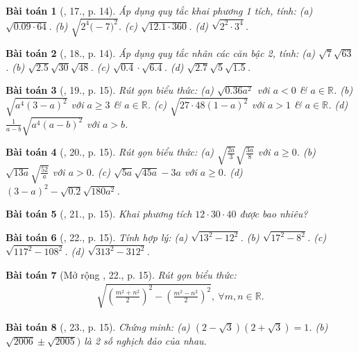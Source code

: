 \documentclass{article}
\newtheorem{baitoan}{Bài toán}
\begin{document}
\begin{baitoan}[\cite{SGK_Toan_9_tap_1}, 17., p. 14]
	Áp dụng quy tắc khai phương 1 tích, tính: (a) $\sqrt{0.09\cdot64}$. (b) $\sqrt{2^4\dot(-7)^2}$. (c) $\sqrt{12.1\cdot360}$. (d) $\sqrt{2^2\cdot3^4}$.
\end{baitoan}

\begin{baitoan}[\cite{SGK_Toan_9_tap_1}, 18., p. 14]
	Áp dụng quy tắc nhân các căn bậc 2, tính: (a) $\sqrt{7}\sqrt{63}$. (b) $\sqrt{2.5}\sqrt{30}\sqrt{48}$. (c) $\sqrt{0.4}\cdot\sqrt{6.4}$. (d) $\sqrt{2.7}\sqrt{5}\sqrt{1.5}$.
\end{baitoan}

\begin{baitoan}[\cite{SGK_Toan_9_tap_1}, 19., p. 15]
	Rút gọn biểu thức: (a) $\sqrt{0.36a^2}$ với $a < 0$ \& $a\in\mathbb{R}$. (b) $\sqrt{a^4(3 - a)^2}$ với $a\ge3$ \& $a\in\mathbb{R}$. (c) $\sqrt{27\cdot48(1 - a)^2}$ với $a > 1$ \& $a\in\mathbb{R}$. (d) $\frac{1}{a - b}\sqrt{a^4(a - b)^2}$ với $a > b$.
\end{baitoan}

\begin{baitoan}[\cite{SGK_Toan_9_tap_1}, 20., p. 15]
	Rút gọn biểu thức: (a) $\sqrt{\frac{2a}{3}}\sqrt{\frac{3a}{8}}$ với $a\ge0$. (b) $\sqrt{13a}\sqrt{\frac{52}{a}}$ với $a > 0$. (c) $\sqrt{5a}\sqrt{45a} - 3a$ với $a\ge0$. (d) $(3 - a)^2 - \sqrt{0.2}\sqrt{180a^2}$.
\end{baitoan}

\begin{baitoan}[\cite{SGK_Toan_9_tap_1}, 21., p. 15]
	Khai phương tích $12\cdot30\cdot40$ được bao nhiêu?
\end{baitoan}

\begin{baitoan}[\cite{SGK_Toan_9_tap_1}, 22., p. 15]
	Tính hợp lý: (a) $\sqrt{13^2 - 12^2}$. (b) $\sqrt{17^2 - 8^2}$. (c) $\sqrt{117^2 - 108^2}$. (d) $\sqrt{313^2 - 312^2}$.
\end{baitoan}

\begin{baitoan}[Mở rộng \cite{SGK_Toan_9_tap_1}, 22., p. 15]
	Rút gọn biểu thức:
	\begin{align*}
		\sqrt{\left(\frac{m^2 + n^2}{2}\right)^2 - \left(\frac{m^2 - n^2}{2}\right)^2},\ \forall m,n\in\mathbb{R}.
	\end{align*}
\end{baitoan}

\begin{baitoan}[\cite{SGK_Toan_9_tap_1}, 23., p. 15]
	Chứng minh: (a) $(2 - \sqrt{3})(2 + \sqrt{3}) = 1$. (b) $\sqrt{2006}\pm\sqrt{2005})$ là 2 số nghịch đảo của nhau.
\end{baitoan}
\end{document}
